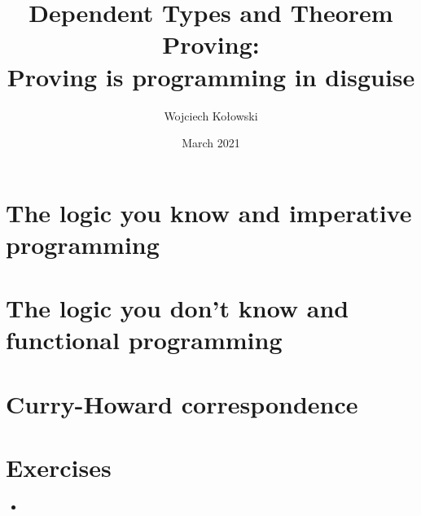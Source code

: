 \documentclass{beamer}
\title{Dependent Types and Theorem Proving: \\Proving is programming in disguise}
\author{Wojciech Kołowski}
\date{March 2021}
\begin{document}
\frame{\titlepage}
\frame{\tableofcontents}

\section{The logic you know and imperative programming}
\section{The logic you don't know and functional programming}
\section{Curry-Howard correspondence}
\section{Exercises}

\begin{frame}{}
\begin{itemize}
	\item 
\end{itemize}
\end{frame}
\end{document}
